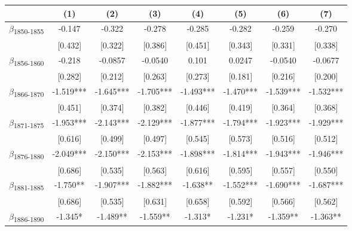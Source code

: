 {
\def\sym#1{\ifmmode^{#1}\else\(^{#1}\)\fi}
\begin{tabular}{l*{7}{c}}
\toprule
            &\multicolumn{1}{c}{(1)}   &\multicolumn{1}{c}{(2)}   &\multicolumn{1}{c}{(3)}   &\multicolumn{1}{c}{(4)}   &\multicolumn{1}{c}{(5)}   &\multicolumn{1}{c}{(6)}   &\multicolumn{1}{c}{(7)}   \\
\midrule
$\beta$\textsubscript{1850-1855}&      -0.147   &      -0.322   &      -0.278   &      -0.285   &      -0.282   &      -0.259   &      -0.270   \\
            &     [0.432]   &     [0.322]   &     [0.386]   &     [0.451]   &     [0.343]   &     [0.331]   &     [0.338]   \\
$\beta$\textsubscript{1856-1860}&      -0.218   &     -0.0857   &     -0.0540   &       0.101   &      0.0247   &     -0.0540   &     -0.0677   \\
            &     [0.282]   &     [0.212]   &     [0.263]   &     [0.273]   &     [0.181]   &     [0.216]   &     [0.200]   \\
$\beta$\textsubscript{1866-1870}&      -1.519***&      -1.645***&      -1.705***&      -1.493***&      -1.470***&      -1.539***&      -1.532***\\
            &     [0.451]   &     [0.374]   &     [0.382]   &     [0.446]   &     [0.419]   &     [0.364]   &     [0.368]   \\
$\beta$\textsubscript{1871-1875}&      -1.953***&      -2.143***&      -2.129***&      -1.877***&      -1.794***&      -1.923***&      -1.929***\\
            &     [0.616]   &     [0.499]   &     [0.497]   &     [0.545]   &     [0.573]   &     [0.516]   &     [0.512]   \\
$\beta$\textsubscript{1876-1880}&      -2.049***&      -2.150***&      -2.153***&      -1.898***&      -1.814***&      -1.943***&      -1.946***\\
            &     [0.686]   &     [0.535]   &     [0.563]   &     [0.616]   &     [0.595]   &     [0.557]   &     [0.550]   \\
$\beta$\textsubscript{1881-1885}&      -1.750** &      -1.907***&      -1.882***&      -1.638** &      -1.552***&      -1.690***&      -1.687***\\
            &     [0.686]   &     [0.535]   &     [0.631]   &     [0.658]   &     [0.592]   &     [0.566]   &     [0.562]   \\
$\beta$\textsubscript{1886-1890}&      -1.345*  &      -1.489** &      -1.559** &      -1.313*  &      -1.231*  &      -1.359** &      -1.363** \\

\end{tabular}}
